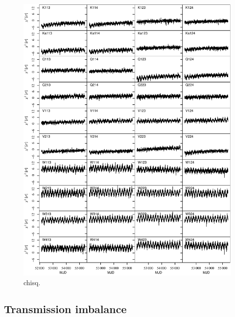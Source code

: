\documentclass[twocolumn]{../../common/aa}
\begin{document}
\begin{figure}[p]
	\centering
	\includegraphics[width=\textwidth]{figures/instpar_CG_chisq_v1.pdf}
	\caption{chisq.}
	\label{fig:chisq}
\end{figure}


\subsection{Transmission imbalance}
\end{document}
